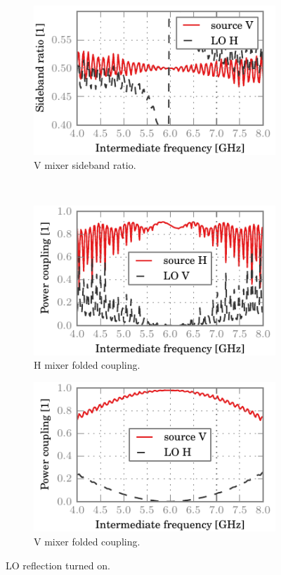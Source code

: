 \begin{figure}[hbtp]
    \begin{subfigure}[b]{.5\textwidth}
        \includegraphics{chapter_3/12_lor_att00_v_sbr}%
        \caption{V mixer sideband ratio.}
    \end{subfigure}%
    \\
    \begin{subfigure}[b]{.5\textwidth}
        \includegraphics{chapter_3/12_lor_att00_h_ssb}%
        \caption{H mixer folded coupling.}
    \end{subfigure}%
    \begin{subfigure}[b]{.5\textwidth}
        \includegraphics{chapter_3/12_lor_att00_v_ssb}%
        \caption{V mixer folded coupling.}
    \end{subfigure}%
    \caption{LO reflection turned on.}
    \label{fig:12_lor_att00}
\end{figure}

